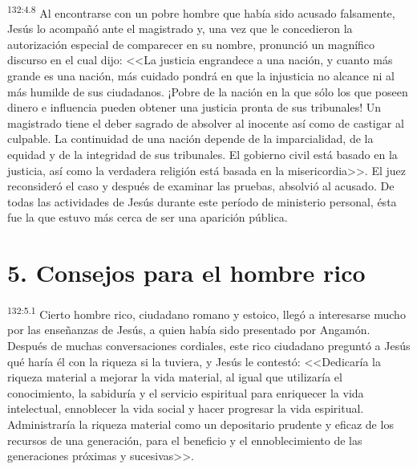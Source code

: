 \par 
\textsuperscript{132:4.8} Al encontrarse con un pobre hombre que había sido acusado falsamente, Jesús lo acompañó ante el magistrado y, una vez que le concedieron la autorización especial de comparecer en su nombre, pronunció un magnífico discurso en el cual dijo: <<La justicia engrandece a una nación, y cuanto más grande es una nación, más cuidado pondrá en que la injusticia no alcance ni al más humilde de sus ciudadanos. ¡Pobre de la nación en la que sólo los que poseen dinero e influencia pueden obtener una justicia pronta de sus tribunales! Un magistrado tiene el deber sagrado de absolver al inocente así como de castigar al culpable. La continuidad de una nación depende de la imparcialidad, de la equidad y de la integridad de sus tribunales. El gobierno civil está basado en la justicia, así como la verdadera religión está basada en la misericordia>>. El juez reconsideró el caso y después de examinar las pruebas, absolvió al acusado. De todas las actividades de Jesús durante este período de ministerio personal, ésta fue la que estuvo más cerca de ser una aparición pública.

\section*{5. Consejos para el hombre rico}
\par 
\textsuperscript{132:5.1} Cierto hombre rico, ciudadano romano y estoico, llegó a interesarse mucho por las enseñanzas de Jesús, a quien había sido presentado por Angamón. Después de muchas conversaciones cordiales, este rico ciudadano preguntó a Jesús qué haría él con la riqueza si la tuviera, y Jesús le contestó: <<Dedicaría la riqueza material a mejorar la vida material, al igual que utilizaría el conocimiento, la sabiduría y el servicio espiritual para enriquecer la vida intelectual, ennoblecer la vida social y hacer progresar la vida espiritual. Administraría la riqueza material como un depositario prudente y eficaz de los recursos de una generación, para el beneficio y el ennoblecimiento de las generaciones próximas y sucesivas>>.

